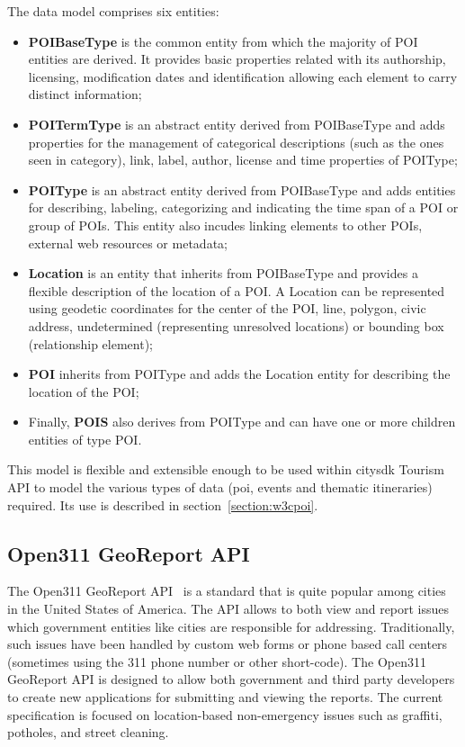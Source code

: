 \documentclass[times]{ettauth}
\begin{document}
The data model comprises six entities:
\begin{itemize}
\item \textbf{POIBaseType} is the common entity from which the majority of \ac{POI} entities are derived.
It provides basic properties related with its authorship, licensing, modification dates and identification allowing each element to carry distinct information;
\item \textbf{POITermType} is an abstract entity derived from POIBaseType and adds properties for the management of categorical descriptions (such as the ones seen in category), link, label, author, license and time properties of POIType;
\item \textbf{POIType} is an abstract entity derived from POIBaseType and adds entities for describing, labeling, categorizing and indicating the time span of a \ac{POI} or group of \acp{POI}.
This entity also incudes linking elements to other POIs, external web resources or metadata;
\item \textbf{Location} is an entity that inherits from POIBaseType and provides a flexible description of the location of a \ac{POI}.
A Location can be represented using geodetic coordinates for the center of the POI, line, polygon, civic address, undetermined (representing unresolved locations) or bounding box (relationship element);
\item \textbf{POI} inherits from POIType and adds the Location entity for describing the location of the \ac{POI};
\item Finally, \textbf{POIS} also derives from POIType and can have one or more children entities of type \ac{POI}.
\end{itemize}

This model is flexible and extensible enough to be used within \ac{citysdk} Tourism API to model the various types of data (\ac{poi}, events and thematic itineraries) required.
Its use is described in section~\ref{section:w3cpoi}.

\subsection{Open311 GeoReport API}
The Open311 GeoReport API~\cite{open311} is a standard that is quite popular among cities in the United States of America.
The API allows to both view and report issues which government entities like cities are responsible for addressing.
Traditionally, such issues have been handled by custom web forms or phone based call centers (sometimes using the 311 phone number or other short-code).
The Open311 GeoReport API is designed to allow both government and third party developers to create new applications for submitting and viewing the reports.
The current specification is focused on location-based non-emergency issues such as graffiti, potholes, and street cleaning.
\end{document}
